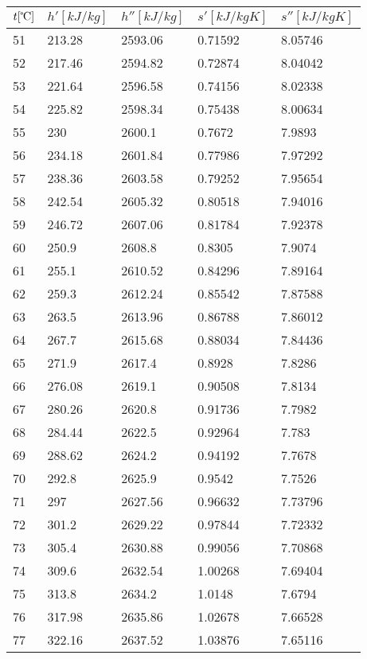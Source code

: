 \documentclass[twocolumn]{article}
\begin{document}
\begin{tabular}{l|l|l|l|l}
	$t [\text{\textcelsius}] $ & $h' [kJ/kg]$ & $h'' [kJ/kg]$ & $s' [kJ/kg K] $ & $s'' [kJ/kg K]$ \\ \hline
51	&	213.28	&	2593.06	&	0.71592	&	8.05746 \\ \hline
52	&	217.46	&	2594.82	&	0.72874	&	8.04042 \\ \hline
53	&	221.64	&	2596.58	&	0.74156	&	8.02338 \\ \hline
54	&	225.82	&	2598.34	&	0.75438	&	8.00634 \\ \hline
55	&	230	&	2600.1	&	0.7672	&	7.9893 \\ \hline
56	&	234.18	&	2601.84	&	0.77986	&	7.97292 \\ \hline
57	&	238.36	&	2603.58	&	0.79252	&	7.95654 \\ \hline
58	&	242.54	&	2605.32	&	0.80518	&	7.94016 \\ \hline
59	&	246.72	&	2607.06	&	0.81784	&	7.92378 \\ \hline
60	&	250.9	&	2608.8	&	0.8305	&	7.9074 \\ \hline
61	&	255.1	&	2610.52	&	0.84296	&	7.89164 \\ \hline
62	&	259.3	&	2612.24	&	0.85542	&	7.87588 \\ \hline
63	&	263.5	&	2613.96	&	0.86788	&	7.86012 \\ \hline
64	&	267.7	&	2615.68	&	0.88034	&	7.84436 \\ \hline
65	&	271.9	&	2617.4	&	0.8928	&	7.8286 \\ \hline
66	&	276.08	&	2619.1	&	0.90508	&	7.8134 \\ \hline
67	&	280.26	&	2620.8	&	0.91736	&	7.7982 \\ \hline
68	&	284.44	&	2622.5	&	0.92964	&	7.783 \\ \hline
69	&	288.62	&	2624.2	&	0.94192	&	7.7678 \\ \hline
70	&	292.8	&	2625.9	&	0.9542	&	7.7526 \\ \hline
71	&	297	&	2627.56	&	0.96632	&	7.73796 \\ \hline
72	&	301.2	&	2629.22	&	0.97844	&	7.72332 \\ \hline
73	&	305.4	&	2630.88	&	0.99056	&	7.70868 \\ \hline
74	&	309.6	&	2632.54	&	1.00268	&	7.69404 \\ \hline
75	&	313.8	&	2634.2	&	1.0148	&	7.6794 \\ \hline
76	&	317.98	&	2635.86	&	1.02678	&	7.66528 \\ \hline
77	&	322.16	&	2637.52	&	1.03876	&	7.65116 \\ \hline

\end{tabular}
\end{document}
